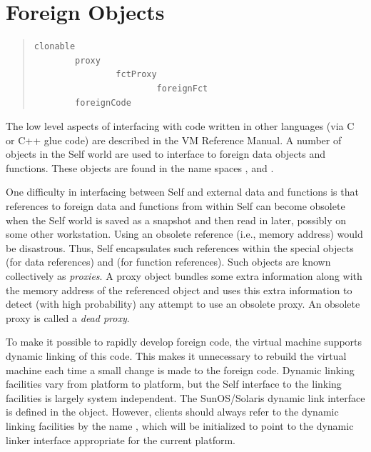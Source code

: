 \documentclass[letterpaper,10pt,english]{sphinxmanual}
\begin{document}
\section{Foreign Objects}
\label{foreign:index-4}\label{foreign:foreign-objects}\label{foreign::doc}\begin{quote}

\begin{Verbatim}[commandchars=\\\{\}]
clonable
        proxy
                fctProxy
                        foreignFct
        foreignCode
\end{Verbatim}
\end{quote}

The low level aspects of interfacing with code written in other languages (via C or C++ glue code)
are described in the VM Reference Manual. A number of objects in the Self world are used to interface
to foreign data objects and functions. These objects are found in the name spaces 
, and .

One difficulty in interfacing between Self and external data and functions is that references to foreign
data and functions from within Self can become obsolete when the Self world is saved as
a snapshot and then read in later, possibly on some other workstation. Using an obsolete reference
(i.e., memory address) would be disastrous. Thus, Self encapsulates such references within the
special objects  (for data references) and  (for function references). Such objects
are known collectively as \emph{proxies}. A proxy object bundles some extra information along with the
memory address of the referenced object and uses this extra information to detect (with high probability)
any attempt to use an obsolete proxy. An obsolete proxy is called a \emph{dead proxy}.

To make it possible to rapidly develop foreign code, the virtual machine supports dynamic linking
of this code. This makes it unnecessary to rebuild the virtual machine each time a small change is
made to the foreign code. Dynamic linking facilities vary from platform to platform, but the Self
interface to the linking facilities is largely system independent. The SunOS/Solaris dynamic link
interface is defined in the  object. However, clients should always refer to the dynamic
linking facilities by the name , which will be initialized to point to the dynamic linker interface
appropriate for the current platform.
\end{document}
